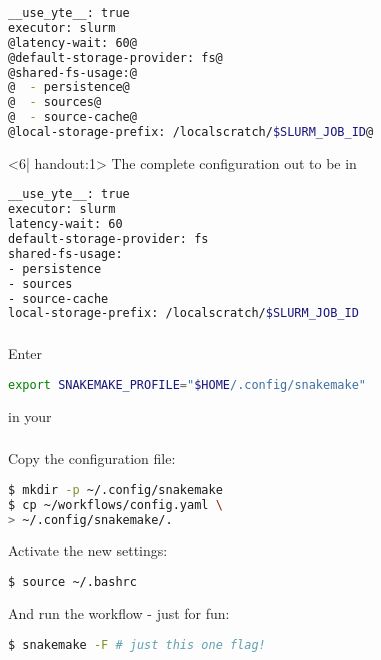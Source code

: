 \begin{frame}[fragile]
\begin{onlyenv}
\begin{warning}
  	\end{warning}
  	\begin{lstlisting}[language=Bash, style=Shell]
__use_yte__: true
executor: slurm
@latency-wait: 60@
@default-storage-provider: fs@
@shared-fs-usage:@
@  - persistence@
@  - sources@
@  - source-cache@
@local-storage-prefix: /localscratch/$SLURM_JOB_ID@
  	 \end{lstlisting}
  \end{onlyenv}
   \begin{onlyenv}<6| handout:1>
   	The complete configuration out to be in 
   	\begin{lstlisting}[language=Bash, style=Shell]
__use_yte__: true
executor: slurm
latency-wait: 60
default-storage-provider: fs
shared-fs-usage:
- persistence
- sources
- source-cache
local-storage-prefix: /localscratch/$SLURM_JOB_ID
    \end{lstlisting}
  \end{onlyenv}
\end{frame}


\begin{frame}[fragile]
	\frametitle{}
	Enter 
	\begin{lstlisting}[language=Bash, style=Shell]
export SNAKEMAKE_PROFILE="$HOME/.config/snakemake"
    \end{lstlisting}
	in your 
\end{frame}

\begin{frame}[fragile]
	\frametitle{}
	Copy the configuration file:
	\begin{lstlisting}[language=Bash, style=Shell]
$ mkdir -p ~/.config/snakemake
$ cp ~/workflows/config.yaml \
> ~/.config/snakemake/.
	\end{lstlisting}
    Activate the new settings:
    \begin{lstlisting}[language=Bash, style=Shell]
$ source ~/.bashrc
    \end{lstlisting}
    And run the workflow - just for fun:
    \begin{lstlisting}[language=Bash, style=Shell]
$ snakemake -F # just this one flag!
    \end{lstlisting}
\end{frame}

	

